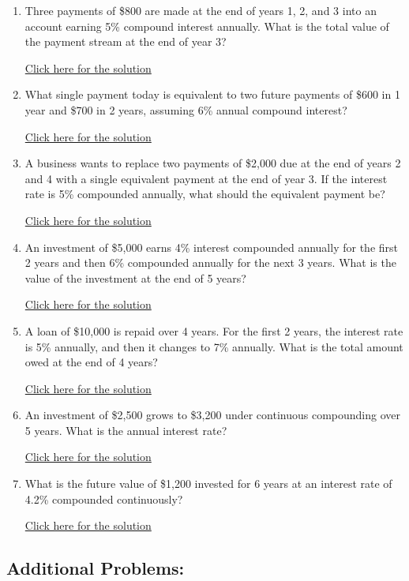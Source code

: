 \documentclass[
]{book}
\providecommand{\tightlist}{%
  \setlength{\itemsep}{0pt}\setlength{\parskip}{0pt}}
\begin{document}
\begin{enumerate}
\def\labelenumi{\arabic{enumi}.}
\tightlist
\item
  Three payments of \$800 are made at the end of years 1, 2, and 3 into an account earning 5\% compound interest annually. What is the total value of the payment stream at the end of year 3?

  \href{https://youtu.be/Tqoxyk1YPeo}{Click here for the solution}
\item
  What single payment today is equivalent to two future payments of \$600 in 1 year and \$700 in 2 years, assuming 6\% annual compound interest?

  \href{https://youtu.be/heaWuNOF9Wk}{Click here for the solution}
\item
  A business wants to replace two payments of \$2,000 due at the end of years 2 and 4 with a single equivalent payment at the end of year 3. If the interest rate is 5\% compounded annually, what should the equivalent payment be?

  \href{https://youtu.be/Q_GTSXLL-9c}{Click here for the solution}
\item
  An investment of \$5,000 earns 4\% interest compounded annually for the first 2 years and then 6\% compounded annually for the next 3 years. What is the value of the investment at the end of 5 years?

  \href{https://youtu.be/0_4bwUvlFeg}{Click here for the solution}
\item
  A loan of \$10,000 is repaid over 4 years. For the first 2 years, the interest rate is 5\% annually, and then it changes to 7\% annually. What is the total amount owed at the end of 4 years?

  \href{https://youtu.be/DjsulaiwpTc}{Click here for the solution}
\item
  An investment of \$2,500 grows to \$3,200 under continuous compounding over 5 years. What is the annual interest rate?

  \href{https://youtu.be/evQHobJj7GY}{Click here for the solution}
\item
  What is the future value of \$1,200 invested for 6 years at an interest rate of 4.2\% compounded continuously?

  \href{https://youtu.be/KuNy6RN3H3k}{Click here for the solution}
\end{enumerate}

\subsection*{Additional Problems:}\label{additional-problems-11}
\end{document}

